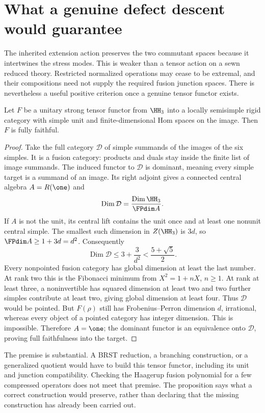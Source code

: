 \section{What a genuine defect descent would guarantee}

The inherited extension action preserves the two commutant spaces
because it intertwines the stress modes. This is weaker than a
tensor action on a sewn reduced theory. Restricted normalized
operations may cease to be extremal, and their compositions need
not supply the required fusion junction spaces. There is nevertheless
a useful positive criterion once a genuine tensor functor exists.

\begin{proposition}
\label{prop:c-faithful-descent}
Let $F$ be a unitary strong tensor functor from $\HH_3$ into a
locally semisimple rigid category with simple unit and
finite-dimensional Hom spaces on the image. Then $F$ is fully
faithful.
\end{proposition}
\begin{proof}
Take the full category $\mathcal D$ of simple summands of the images
of the six simples. It is a fusion category: products and duals stay
inside the finite list of image summands. The induced functor to
$\mathcal D$ is dominant, meaning every simple target is a summand of
an image. Its right adjoint gives a connected
central algebra $A=R(\one)$ and
\[
 \operatorname{Dim}\mathcal D
       =\frac{\operatorname{Dim}\HH_3}{\FPdim A}.
\]
If $A$ is not the unit, its central lift contains the unit once and
at least one nonunit central simple. The smallest such dimension in
$Z(\HH_3)$ is $3d$, so
$\FPdim A\geq1+3d=d^2$. Consequently
\[
 \operatorname{Dim}\mathcal D\leq3+\frac3{d^2}
                                      <\frac{5+\sqrt5}{2}.
\]
Every nonpointed fusion category has global dimension at least the
last number. At rank two this is the Fibonacci minimum from
$X^2=1+nX$, $n\geq1$. At rank at least three, a noninvertible
has squared dimension at least two and two further simples contribute
at least two, giving global dimension at least four.
Thus $\mathcal D$ would be pointed. But $F(\rho)$ still has
Frobenius--Perron dimension $d$, irrational, whereas every object of
a pointed category has integer dimension. This is impossible.
Therefore $A=\one$; the dominant functor is an equivalence onto
$\mathcal D$, proving full faithfulness into the target.
\end{proof}

The premise is substantial. A BRST reduction, a branching construction,
or a generalized quotient would have to build this tensor functor,
including its unit and junction compatibility. Checking the Haagerup
fusion polynomial for a few compressed operators does not meet that
premise. The proposition says what a correct construction would
preserve, rather than declaring that the missing construction has
already been carried out.

